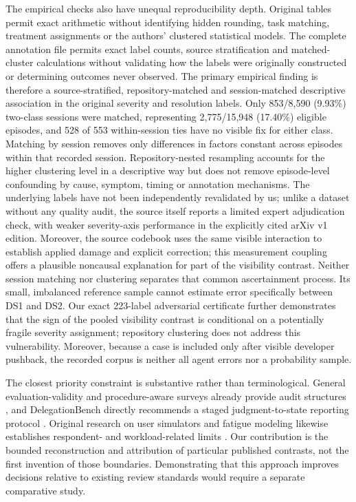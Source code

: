 The empirical checks also have unequal reproducibility depth. Original tables permit exact arithmetic without identifying hidden rounding, task matching, treatment assignments or the authors' clustered statistical models. The complete annotation file permits exact label counts, source stratification and matched-cluster calculations without validating how the labels were originally constructed or determining outcomes never observed. The primary empirical finding is therefore a source-stratified, repository-matched and session-matched descriptive association in the original severity and resolution labels. Only 853/8,590 (9.93\%) two-class sessions were matched, representing 2,775/15,948 (17.40\%) eligible episodes, and 528 of 553 within-session ties have no visible fix for either class. Matching by session removes only differences in factors constant across episodes within that recorded session. Repository-nested resampling accounts for the higher clustering level in a descriptive way but does not remove episode-level confounding by cause, symptom, timing or annotation mechanisms. The underlying labels have not been independently revalidated by us; unlike a dataset without any quality audit, the source itself reports a limited expert adjudication check, with weaker severity-axis performance in the explicitly cited arXiv v1 edition. Moreover, the source codebook uses the same visible interaction to establish applied damage and explicit correction; this measurement coupling offers a plausible noncausal explanation for part of the visibility contrast. Neither session matching nor clustering separates that common ascertainment process. Its small, imbalanced reference sample cannot estimate error specifically between DS1 and DS2. Our exact 223-label adversarial certificate further demonstrates that the sign of the pooled visibility contrast is conditional on a potentially fragile severity assignment; repository clustering does not address this vulnerability. Moreover, because a case is included only after visible developer pushback, the recorded corpus is neither all agent errors nor a probability sample.

The closest priority constraint is substantive rather than terminological. General evaluation-validity and procedure-aware surveys already provide audit structures \cite{ref2,ref9}, and DelegationBench directly recommends a staged judgment-to-state reporting protocol \cite{ref12}. Original research on user simulators and fatigue modeling likewise establishes respondent- and workload-related limits \cite{ref44,ref46}. Our contribution is the bounded reconstruction and attribution of particular published contrasts, not the first invention of those boundaries. Demonstrating that this approach improves decisions relative to existing review standards would require a separate comparative study.


